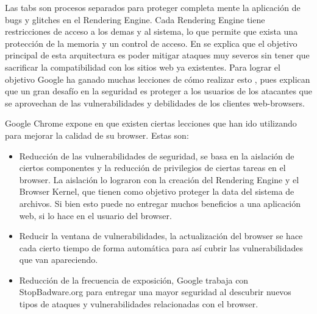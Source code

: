 Las tabs son procesos separados para proteger completa mente la aplicación de bugs y glitches en el Rendering Engine. Cada Rendering Engine tiene restricciones de acceso a los demas y al sistema, lo que permite que exista una protección de la memoria y un control de acceso. En \cite{barth2008security} se explica que el objetivo principal de esta arquitectura es poder mitigar ataques muy severos sin tener que sacrificar la compatibilidad con los sitios web ya existentes. Para lograr el objetivo Google ha ganado muchas lecciones de cómo realizar esto \cite{reis2009browser}, pues explican que un gran desafío en la seguridad es proteger a los usuarios de los atacantes que se aprovechan de las vulnerabilidades y debilidades de los clientes web-browsers.

Google Chrome expone en \cite{reis2009browser} que existen ciertas lecciones que han ido utilizando para mejorar la calidad de su browser. Estas son:

\begin{itemize}
	\item Reducción de las vulnerabilidades de seguridad, se basa en la aislación de ciertos componentes y la reducción de privilegios de ciertas tareas en el browser. La aislación lo lograron con la creación del Rendering Engine y el Browser Kernel, que tienen como objetivo proteger la data del sistema de archivos. Si bien esto puede no entregar muchos beneficios a una aplicación web, si lo hace en el usuario del browser.
	\item Reducir la ventana de vulnerabilidades, la actualización del browser se hace cada cierto tiempo de forma automática para así cubrir las vulnerabilidades que van apareciendo.
	\item Reducción de la frecuencia de exposición, Google trabaja con StopBadware.org para entregar una mayor seguridad al descubrir nuevos tipos de ataques y vulnerabilidades relacionadas con el browser.
\end{itemize}


